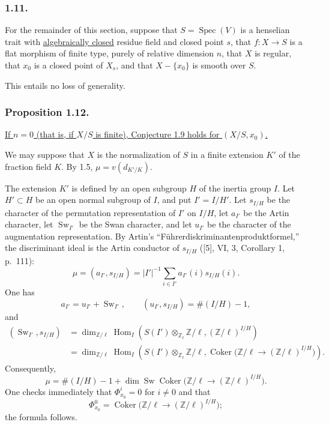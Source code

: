 \subsubsection*{1.11.}
For the remainder of this section, suppose that
$S=\operatorname{Spec}(V)$ is a henselian trait with
\underline{algebraically closed} residue field and closed point $s$,
that $f:X\to S$ is a flat morphism of finite type, purely of relative
dimension $n$, that $X$ is regular, that $x_0$ is a closed point of
$X_s$, and that $X-\{x_0\}$ is smooth over $S$.

This entails no loss of generality.

\subsubsection*{Proposition 1.12.}
\underline{If $n=0$ (that is, if $X/S$ is finite), Conjecture 1.9
holds for $(X/S,x_0)$.}

We may suppose that $X$ is the normalization of $S$ in a finite
extension $K'$ of the fraction field $K$.  By 1.5,
$\mu=v(d_{K'/K})$.

The extension $K'$ is defined by an open subgroup $H$ of the inertia
group $I$.  Let $H'\subset H$ be an open normal subgroup of $I$, and
put $I'=I/H'$.  Let $s_{I/H}$ be the character of the permutation
representation of $I'$ on $I/H$, let $a_{I'}$ be the Artin
character, let $\operatorname{Sw}_{I'}$ be the Swan character, and
let $u_{I'}$ be the character of the augmentation representation.
By Artin's ``F\"uhrerdiskriminantenproduktformel,'' the discriminant
ideal is the Artin conductor of $s_{I/H}$ ([5], VI, 3, Corollary 1,
p.~111):
\[
\mu=(a_{I'},s_{I/H})
=|I'|^{-1}\sum_{i\in I'}a_{I'}(i)s_{I/H}(i).
\]
One has
\[
a_{I'}=u_{I'}+\operatorname{Sw}_{I'},
\qquad
(u_{I'},s_{I/H})=\#(I/H)-1,
\]
and
\begin{align*}
(\operatorname{Sw}_{I'},s_{I/H})
&=\dim_{\mathbb Z/\ell}\operatorname{Hom}_I\!\left(
S(I')\otimes_{\mathbb Z_\ell}\mathbb Z/\ell,
(\mathbb Z/\ell)^{I/H}\right)\\
&=\dim_{\mathbb Z/\ell}\operatorname{Hom}_I\!\left(
S(I')\otimes_{\mathbb Z_\ell}\mathbb Z/\ell,
\operatorname{Coker}\bigl(
\mathbb Z/\ell\longrightarrow(\mathbb Z/\ell)^{I/H}\bigr)
\right).
\end{align*}
Consequently,
\[
\mu=\#(I/H)-1+
\dim\operatorname{Sw}\operatorname{Coker}\bigl(
\mathbb Z/\ell\longrightarrow(\mathbb Z/\ell)^{I/H}\bigr).
\]
One checks immediately that $\Phi^i_{x_0}=0$ for $i\ne0$ and that
\[
\Phi^0_{x_0}=\operatorname{Coker}\bigl(
\mathbb Z/\ell\longrightarrow(\mathbb Z/\ell)^{I/H}\bigr);
\]
the formula follows.
